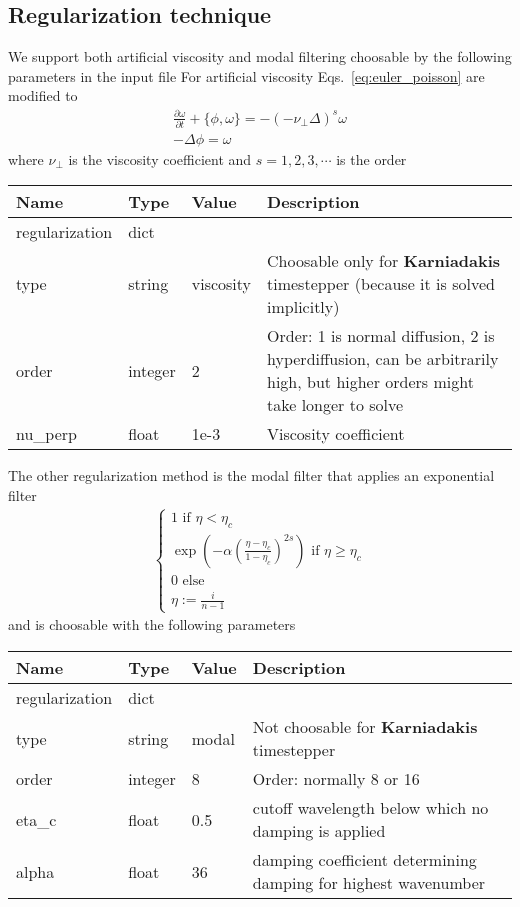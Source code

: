 \subsection{Regularization technique}
We support both artificial viscosity and modal filtering choosable by the following
parameters in the input file
For artificial viscosity Eqs.~\eqref{eq:euler_poisson} are modified to
\begin{subequations}
\begin{align}
    \frac{\partial \omega}{\partial t} + \{ \phi, \omega\} = -(-\nu_\perp \Delta)^s \omega\\
 -\Delta \phi = \omega
\end{align}
\label{eq:euler_poisson_viscous}
\end{subequations}
where $\nu_\perp$ is the viscosity coefficient and $s=1,2,3,\cdots$ is the order
\begin{longtable}{lllp{7.5cm}}
\toprule
\rowcolor{gray!50}\textbf{Name} &  \textbf{Type} & \textbf{Value}  & \textbf{Description}  \\ \midrule
regularization & dict & & \\
\qquad type  & string& viscosity & Choosable only for \textbf{Karniadakis} timestepper (because it is solved implicitly) \\
\qquad order    & integer & 2 & Order: 1 is normal diffusion, 2 is hyperdiffusion, can be arbitrarily high, but higher orders might take longer to solve \\
\qquad nu\_perp    & float & 1e-3 & Viscosity coefficient \\
\bottomrule
\end{longtable}
The other regularization method is the modal filter that applies an exponential filter
\begin{align}
    \begin{cases}
    1 \text{ if } \eta < \eta_c \\
    \exp\left( -\alpha  \left(\frac{\eta-\eta_c}{1-\eta_c} \right)^{2s}\right) \text { if } \eta \geq \eta_c \\
    0 \text{ else} \\
    \eta := \frac{i}{n-1}
    \end{cases}
\end{align}
and is choosable with the following parameters
\begin{longtable}{lllp{7.5cm}}
\toprule
\rowcolor{gray!50}\textbf{Name} &  \textbf{Type} & \textbf{Value}  & \textbf{Description}  \\ \midrule
regularization & dict & & \\
\qquad type  & string& modal & Not choosable for \textbf{Karniadakis} timestepper\\
\qquad order & integer & 8 & Order: normally 8 or 16 \\
\qquad eta\_c & float & 0.5 & cutoff wavelength below which no damping is applied \\
\qquad alpha & float & 36 & damping coefficient determining damping for highest wavenumber \\
\bottomrule
\end{longtable}
